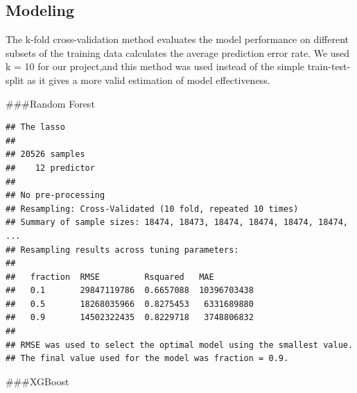 \documentclass[11pt,]{article}
\newenvironment{Shaded}{\begin{snugshade}}{\end{snugshade}}
\newcommand{\KeywordTok}[1]{\textcolor[rgb]{0.13,0.29,0.53}{\textbf{#1}}}
\newcommand{\NormalTok}[1]{#1}
\newcommand{\OperatorTok}[1]{\textcolor[rgb]{0.81,0.36,0.00}{\textbf{#1}}}
\newcommand{\StringTok}[1]{\textcolor[rgb]{0.31,0.60,0.02}{#1}}
\begin{document}
\hypertarget{modeling-1}{%
\subsection{Modeling}\label{modeling-1}}

The k-fold cross-validation method evaluates the model performance on
different subsets of the training data calculates the average prediction
error rate. We used k = 10 for our project,and this method was used
instead of the simple train-test-split as it gives a more valid
estimation of model effectiveness.

\#\#\#Random Forest

\begin{Shaded}
\end{Shaded}

\begin{verbatim}
## The lasso 
## 
## 20526 samples
##    12 predictor
## 
## No pre-processing
## Resampling: Cross-Validated (10 fold, repeated 10 times) 
## Summary of sample sizes: 18474, 18473, 18474, 18474, 18474, 18474, ... 
## Resampling results across tuning parameters:
## 
##   fraction  RMSE         Rsquared   MAE        
##   0.1       29847119786  0.6657088  10396703438
##   0.5       18268035966  0.8275453   6331689880
##   0.9       14502322435  0.8229718   3748806832
## 
## RMSE was used to select the optimal model using the smallest value.
## The final value used for the model was fraction = 0.9.
\end{verbatim}

\#\#\#XGBoost

\begin{Shaded}
\end{Shaded}
\end{document}
